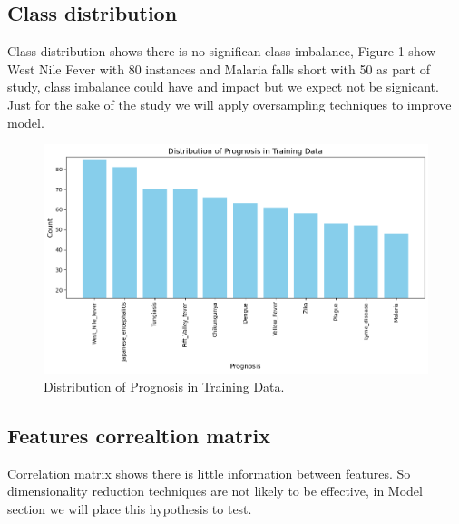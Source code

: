 \documentclass{article}
\begin{document}
\subsection{Class distribution}

Class distribution shows there is no significan class imbalance,
Figure 1 show West Nile Fever with 80 instances and Malaria falls short with 50
as part of study, class imbalance could have and impact but we expect not be 
signicant. Just for the sake of the study we will apply oversampling techniques
to improve model.

\begin{figure}[t] %
    \centering
    \includegraphics[width=.8\linewidth]{DiseaseDistribution.png}
    \caption{Distribution of Prognosis in Training Data.}
    \label{fig:disease_distribution}
    \vspace{-1em} %
\end{figure}

\subsection{Features correaltion matrix}
Correlation matrix shows there is little information between features.
So dimensionality reduction techniques are not likely to be effective,
in Model section we will place this hypothesis to test.
\end{document}
